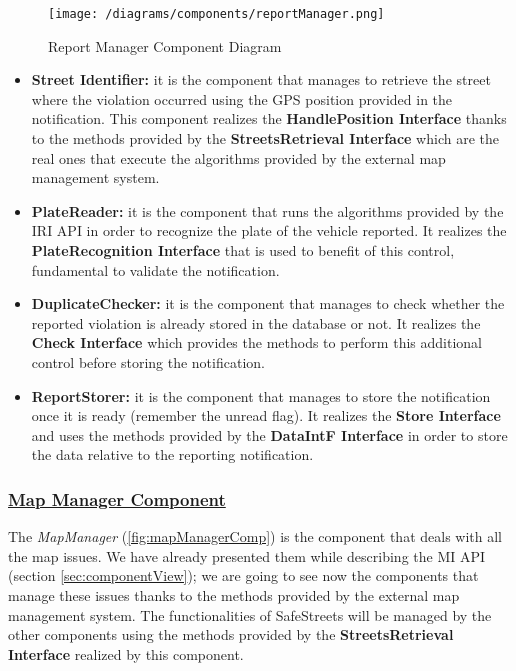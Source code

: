 			\begin{figure}[ht]
				\centering
				\texttt{[image: /diagrams/components/reportManager.png]}
				\caption{\label{fig:reportManagerComp} Report Manager Component Diagram}
			\end{figure}
		
			\begin{itemize}
				\item \textbf{Street Identifier:} it is the component that manages to retrieve the street where the violation occurred using the GPS position provided in the notification. This component realizes the \textbf{HandlePosition Interface} thanks to the methods provided by the \textbf{StreetsRetrieval Interface} which are the real ones that execute the algorithms provided by the external map management system.
				
				\item \textbf{PlateReader:} it is the component that runs the algorithms provided by the IRI API in order to recognize the plate of the vehicle reported. It realizes the \textbf{PlateRecognition Interface} that is used to benefit of this control, fundamental to validate the notification.
				
				\item \textbf{DuplicateChecker:} it is the component that manages to check whether the reported violation is already stored in the database or not. It realizes the \textbf{Check Interface} which provides the methods to perform this additional control before storing the notification.
				
				\item \textbf{ReportStorer:} it is the component that manages to store the notification once it is ready (remember the unread flag). It realizes the \textbf{Store Interface} and uses the methods provided by the \textbf{DataIntF Interface} in order to store the data relative to the reporting notification.
			\end{itemize}
		
		\subsubsection[Map Manager Component]{\hyperlink{toc}{Map Manager Component}}
			\label{sec:mapManagerComponent}
			
			The \emph{MapManager} (\autoref{fig:mapManagerComp}) is the component that deals with all the map issues. We have already presented them while describing the MI API (section \ref{sec:componentView}); we are going to see now the components that manage these issues thanks to the methods provided by the external map management system. The functionalities of SafeStreets will be managed by the other components using the methods provided by the \textbf{StreetsRetrieval Interface} realized by this component.\\
			
